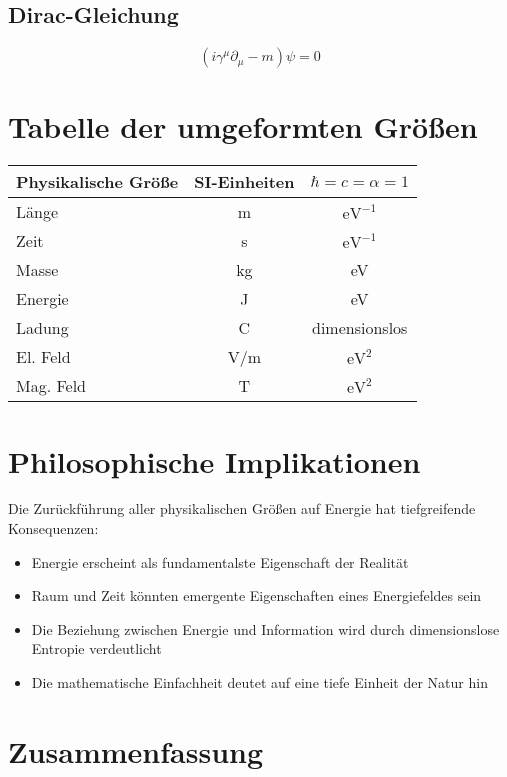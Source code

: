 \documentclass{article}
\begin{document}
	\subsection{Dirac-Gleichung}
	\begin{equation}
		(i\gamma^\mu\partial_\mu - m)\psi = 0
	\end{equation}
	
	\section{Tabelle der umgeformten Größen}
	
	\begin{center}
		\begin{tabular}{|l|c|c|}
			\hline
			\textbf{Physikalische Größe} & \textbf{SI-Einheiten} & \textbf{$\hbar = c = \alpha = 1$} \\
			\hline
			Länge & m & $\text{eV}^{-1}$ \\
			Zeit & s & $\text{eV}^{-1}$ \\
			Masse & kg & eV \\
			Energie & J & eV \\
			Ladung & C & dimensionslos \\
			El. Feld & V/m & $\text{eV}^2$ \\
			Mag. Feld & T & $\text{eV}^2$ \\
			\hline
		\end{tabular}
	\end{center}
	
	\section{Philosophische Implikationen}
	
	Die Zurückführung aller physikalischen Größen auf Energie hat tiefgreifende Konsequenzen:
	
	\begin{itemize}
		\item Energie erscheint als fundamentalste Eigenschaft der Realität
		\item Raum und Zeit könnten emergente Eigenschaften eines Energiefeldes sein
		\item Die Beziehung zwischen Energie und Information wird durch dimensionslose Entropie verdeutlicht
		\item Die mathematische Einfachheit deutet auf eine tiefe Einheit der Natur hin
	\end{itemize}
	
	\section{Zusammenfassung}
	
\end{document}
